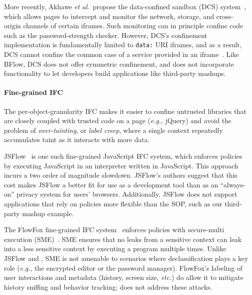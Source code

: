 More recently, Akhawe \emph{et al.}~propose the data-confined sandbox
(DCS) system~\cite{Akhawe2013}, which allows pages to intercept and
monitor the network, storage, and cross-origin channels of certain
iframes.
%
Such monitoring can in principle confine code such as the
password-strength checker.
%
However, DCS's confinement implementation is fundamentally limited to
\verb|data:| URI iframes, and as a result, DCS cannot confine the
common case of a service provided in an iframe~\cite{postman}.
%
Like BFlow, DCS does not offer symmetric confinement, and does
not incorporate functionality to let developers build
applications like third-party mashups.
%

\paragraph{Fine-grained IFC}
The per-object-granularity IFC makes
it easier to confine untrusted libraries that are closely coupled with trusted
code on a page (\emph{e.g.,} jQuery) and avoid the problem of
\emph{over-tainting}, or \emph{label creep}, where a single context
repeatedly accumulates taint as it interacts with more data.

JSFlow~\cite{JSFlow} is one such fine-grained JavaScript IFC system, which
enforces policies by executing JavaScript in an interpreter written in
JavaScript.
%
This approach incurs a two order of magnitude slowdown. JSFlow's
authors suggest that this cost makes JSFlow a better fit for use as a
development tool than as an ``always-on'' privacy system for users'
browsers.
%
Additionally, JSFlow does not support applications that rely on policies
more flexible than the SOP, such as our third-party mashup example.

The FlowFox fine-grained IFC system~\cite{DeGroef:2012} enforces
policies with secure-multi execution (SME)~\cite{Devriese:2010}. SME
ensures that no leaks from a sensitive context can leak into a less
sensitive context by executing a program multiple times.
%
Unlike JSFlow and \sys{}, SME is not amenable to
scenarios where declassification plays a key role (\emph{e.g.,} the encrypted
editor or the password manager).
%
FlowFox's labeling of user interactions and metadata (history, screen
size, \emph{etc.}) do allow it to mitigate history sniffing and
behavior tracking; \sys{} does not address these attacks.

